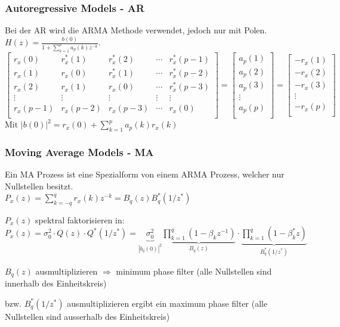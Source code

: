 \subsubsection{Autoregressive Models - AR }
\label{sec:autoregressive_model_method}
Bei der AR wird die ARMA Methode verwendet, jedoch nur mit Polen. $H(z)=\frac{b(0)}{1+\sum\limits_{k=1}^{p} a_p(k)z^{-k}}$.\\
 $$\begin{bmatrix} 
	 	r_x(0)  & r_x^*(1) & r_x^*(2) & \cdots & r_x^*(p-1)\\
	 	r_x(1)  & r_x(0) & r_x^*(1) & \cdots & r_x^*(p-2)\\
	 	r_x(2)  & r_x(1) & r_x(0) & \cdots & r_x^*(p-3)\\
	 	\vdots  & \vdots  & \vdots  & \vdots & \vdots\\
	 	r_x(p-1)& r_x(p-2)& r_x(p-3)& \cdots &  r_x(0)\\
   \end{bmatrix}=
   \begin{bmatrix}
    	a_p(1)\\
    	a_p(2)\\
    	a_p(3)\\
    	\vdots\\
    	a_p(p)\\
   \end{bmatrix}=
   \begin{bmatrix}
       	-r_x(1)\\
       	-r_x(2)\\
       	-r_x(3)\\
       	\vdots\\
        -r_x(p)\\
   \end{bmatrix}
 $$
 Mit $|b(0)|^2=r_x(0) + \sum\limits_{k=1}^{p} a_p(k)r_x(k)$
 

 
 \subsubsection{Moving Average Models - MA }
Ein MA Prozess ist eine Spezialform von einem ARMA Prozess, welcher nur Nullstellen besitzt.\\
$P_x(z)=\sum\limits_{k=-q}^{q}r_x(k)z^{-k}=B_q(z)B_q^*(1/z^*)$
\begin{aufzaehlung}
	\item $P_x(z)$ spektral faktorisieren in: $P_x(z)=\sigma^2_0 \cdot Q(z)\cdot Q^*(1/z^*)=\underbrace{\sigma^2_0}_{|b_q(0)|^2} \underbrace{\prod\limits_{k=1}^q (1-\beta_k z^{-1})}_{B_q(z)} \cdot \underbrace{\prod\limits_{k=1}^q (1-\beta_k^* z)}_{B^*_q(1/z^*)}$
	\item $B_q(z)$ ausmultiplizieren $\Rightarrow$ minimum phase filter (alle Nullstellen sind innerhalb des Einheitskreis)
	\item bzw. $B_q^*(1/z^*)$ ausmultiplizieren ergibt ein maximum phase filter (alle Nullstellen sind ausserhalb des Einheitskreis)
\end{aufzaehlung}
